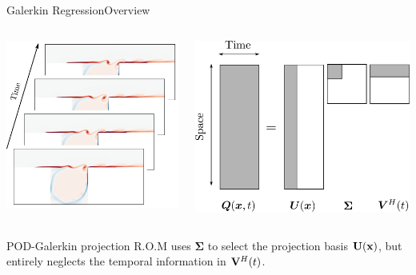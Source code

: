 \documentclass[usenames,dvipsnames,svgnames,10pt,aspectratio=169]{beamer}
\begin{document}
\begin{frame}[t, c]{Galerkin Regression}{Overview}

	\begin{columns}
		\begin{column}{.33\textwidth}
			\centering
			\includegraphics[width=\columnwidth]{dimensionality_reduction}
		\end{column}
		\begin{column}{.4\textwidth}
			\centering
			\includegraphics[width=\columnwidth]{svd}
		\end{column}
	\end{columns}

	\medskip

	POD-Galerkin projection R.O.M uses $\boldsymbol{\Sigma}$ to select the projection basis ${\bf U}({\bf x})$, but entirely neglects the temporal information in ${\bf V}^H(t)$.

	\vspace{1cm}

\end{frame}
\end{document}

